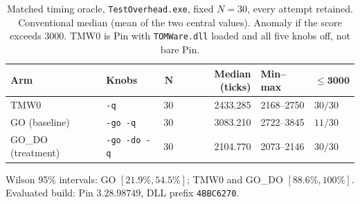 \begin{table}[t]
\caption{Matched timing oracle, \texttt{TestOverhead.exe}, fixed $N=30$, every attempt retained. Conventional median (mean of the two central values). Anomaly if the score exceeds $3000$. TMW0 is Pin with \texttt{TOMWare.dll} loaded and all five knobs off, not bare Pin.}
\label{tab:timing_matched_n30}
\centering
\small
\begin{tabular}{llrrll}
\toprule
\textbf{Arm} & \textbf{Knobs} & $\mathbf{N}$ & \textbf{Median (ticks)} & \textbf{Min--max} & $\boldsymbol{\le 3000}$ \\
\midrule
TMW0 & \texttt{-q} & 30 & 2433.285 & 2168--2750 & $30/30$ \\
GO (baseline) & \texttt{-go -q} & 30 & 3083.210 & 2722--3845 & $11/30$ \\
GO\_DO (treatment) & \texttt{-go -do -q} & 30 & 2104.770 & 2073--2146 & $30/30$ \\
\bottomrule
\end{tabular}
\vspace{3pt}
\parbox{\columnwidth}{\footnotesize
Wilson 95\% intervals: GO $[21.9\%,54.5\%]$; TMW0 and GO\_DO $[88.6\%,100\%]$. Evaluated build: Pin $3.28.98749$, DLL prefix \texttt{4BBC6270}.
}
\end{table}


%
%


